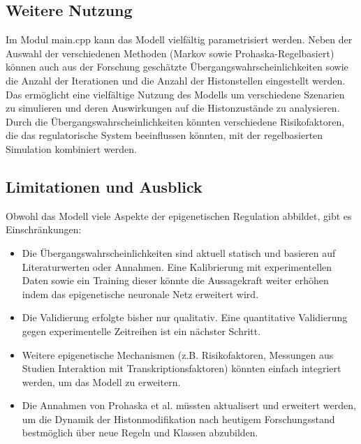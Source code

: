 \documentclass{SeminarV2}
\begin{document}
\subsection{Weitere Nutzung}
Im Modul main.cpp kann das Modell vielfältig parametrisiert werden. Neben der Auswahl der verschiedenen Methoden (Markov sowie Prohaska-Regelbasiert) können auch aus der Forschung geschätzte Übergangswahrscheinlichkeiten sowie die Anzahl der Iterationen und die Anzahl der Histonstellen eingestellt werden.
Das ermöglicht eine vielfältige Nutzung des Modells um verschiedene Szenarien zu simulieren und deren Auswirkungen auf die Histonzustände zu analysieren.
Durch die Übergangswahrscheinlichkeiten könnten verschiedene Risikofaktoren, die das regulatorische System beeinflussen könnten, mit der regelbasierten Simulation kombiniert werden.

\subsection{Limitationen und Ausblick}
Obwohl das Modell viele Aspekte der epigenetischen Regulation abbildet, gibt es Einschr\"{a}nkungen:
\begin{itemize}
    \item Die \"{U}bergangswahrscheinlichkeiten sind aktuell statisch und basieren auf Literaturwerten oder Annahmen. Eine Kalibrierung mit experimentellen Daten sowie ein Training dieser k\"{o}nnte die Aussagekraft weiter erh\"{o}hen indem das epigenetische neuronale Netz erweitert wird.
    \item Die Validierung erfolgte bisher nur qualitativ. Eine quantitative Validierung gegen experimentelle Zeitreihen ist ein n\"{a}chster Schritt.
    \item Weitere epigenetische Mechanismen (z.B. Risikofaktoren, Messungen aus Studien Interaktion mit Transkriptionsfaktoren) k\"{o}nnten einfach integriert werden, um das Modell zu erweitern.
    \item Die Annahmen von Prohaska et al. müssten aktualisert und erweitert werden, um die Dynamik der Histonmodifikation nach heutigem Forschungsstand bestmöglich über neue Regeln und Klassen abzubilden.
\end{itemize}
\end{document}
